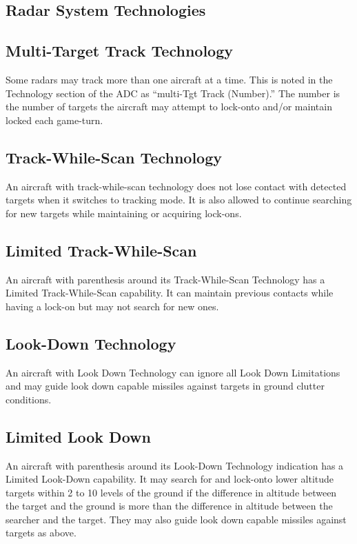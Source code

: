 \begin{advancedrules}

    \section{Radar System Technologies}

    \subsection{Multi-Target Track Technology}\label{rule:multi-target-track-technology} Some radars may track more than one aircraft at a time. This is noted in the Technology section of the ADC as “multi-Tgt Track (Number).” The number is the number of targets the aircraft may attempt to lock-onto and/or maintain locked each game-turn.

    \subsection{Track-While-Scan Technology} \label{rule:track-while-scan-technology} An aircraft with track-while-scan technology does not lose contact with detected targets when it switches to tracking mode. It is also allowed to continue searching for new targets while maintaining or acquiring lock-ons.

    \subsection{Limited Track-While-Scan} An aircraft with parenthesis around its Track-While-Scan Technology has a Limited Track-While-Scan capability. It can maintain previous contacts while having a lock-on but may not search for new ones.

    \subsection{Look-Down Technology} \label{rule:look-down-missiles}
    An aircraft with Look Down Technology can ignore all Look Down Limitations and may guide look down capable missiles against targets in ground clutter conditions.

    \subsection{Limited Look Down} An aircraft with parenthesis around its Look-Down Technology indication has a Limited Look-Down capability.  It may search for and lock-onto lower altitude targets within 2 to 10 levels of the ground if the difference in altitude between the target and the ground is more than the difference in altitude between the searcher and the target. They may also guide look down capable missiles against targets as above.


\end{advancedrules}

